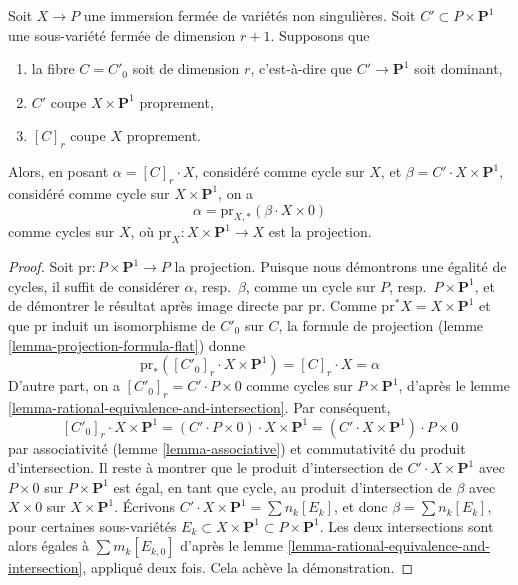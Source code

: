 \begin{lemma}
\label{lemma-transfer}
Soit $X \to P$ une immersion fermée de variétés non singulières.
Soit $C' \subset P \times \mathbf{P}^1$ une sous-variété fermée de dimension
$r + 1$. Supposons que
\begin{enumerate}
\item la fibre $C = C'_0$ soit de dimension $r$, c'est-à-dire que $C' \to \mathbf{P}^1$
soit dominant,
\item $C'$ coupe $X \times \mathbf{P}^1$ proprement,
\item $[C]_r$ coupe $X$ proprement.
\end{enumerate}
Alors, en posant $\alpha = [C]_r \cdot X$, considéré comme cycle sur $X$, et
$\beta = C' \cdot X \times \mathbf{P}^1$, considéré comme cycle sur
$X \times \mathbf{P}^1$, on a
$$
\alpha = \text{pr}_{X, *}(\beta \cdot X \times 0)
$$
comme cycles sur $X$, où $\text{pr}_X : X \times \mathbf{P}^1 \to X$ est la
projection.
\end{lemma}

\begin{proof}
Soit $\text{pr} : P \times \mathbf{P}^1 \to P$ la projection.
Puisque nous démontrons une égalité de cycles, il suffit de considérer
$\alpha$, resp.\ $\beta$, comme un cycle sur $P$, resp.\ $P \times \mathbf{P}^1$,
et de démontrer le résultat après image directe par $\text{pr}$.
Comme $\text{pr}^*X = X \times \mathbf{P}^1$ et que
$\text{pr}$ induit un isomorphisme de $C'_0$ sur $C$,
la formule de projection (lemme \ref{lemma-projection-formula-flat})
donne
$$
\text{pr}_*([C'_0]_r \cdot X \times \mathbf{P}^1) = [C]_r \cdot X = \alpha
$$
D'autre part, on a $[C'_0]_r = C' \cdot P \times 0$
comme cycles sur $P \times \mathbf{P}^1$,
d'après le lemme \ref{lemma-rational-equivalence-and-intersection}.
Par conséquent,
$$
[C'_0]_r \cdot X \times \mathbf{P}^1 =
(C' \cdot P \times 0) \cdot X \times \mathbf{P}^1 =
(C' \cdot X \times \mathbf{P}^1) \cdot P \times 0
$$
par associativité (lemme \ref{lemma-associative}) et commutativité du
produit d'intersection. Il reste à montrer que le produit d'intersection de
$C' \cdot X \times \mathbf{P}^1$ avec $P \times 0$ sur
$P \times \mathbf{P}^1$ est égal, en tant que cycle, au produit d'intersection de
$\beta$ avec $X \times 0$ sur $X \times \mathbf{P}^1$. Écrivons
$C' \cdot X \times \mathbf{P}^1 = \sum n_k[E_k]$, et donc
$\beta = \sum n_k[E_k]$, pour certaines sous-variétés
$E_k \subset X \times \mathbf{P}^1 \subset P \times \mathbf{P}^1$.
Les deux intersections sont alors égales à $\sum m_k[E_{k, 0}]$ d'après le
lemme \ref{lemma-rational-equivalence-and-intersection}, appliqué deux fois.
Cela achève la démonstration.
\end{proof}




